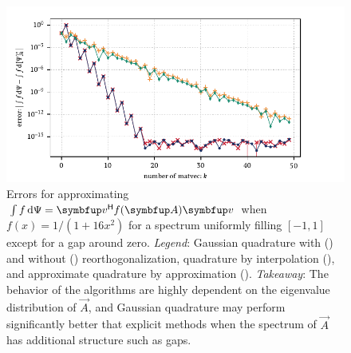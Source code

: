 \begin{figure}[htb]
    \begin{center}
        \includegraphics{imgs/ch3_runge_gap_spec.pdf} 
    \end{center}
    \caption[{Errors for approximating \( \int f \,\d\Psi =  \vec{v}^\cT f(\vec{A}) \vec{v} \) when \( f(x) = 1/(1+16x^2) \) for a spectrum uniformly filling       \( [-1,1] \) except for a gap around zero.}]{%
    Errors for approximating \( \int f \,\d\Psi =  \vec{v}^\cT f(\vec{A}) \vec{v} \) when \( f(x) = 1/(1+16x^2) \) for a spectrum uniformly filling       \( [-1,1] \) except for a gap around zero.
    \hspace{.25em}\emph{Legend}:
    Gaussian quadrature with 
    ({\protect{}})
    and without 
    ({\protect{}})
    reorthogonalization,
    quadrature by interpolation
    ({\protect{}}),
    and approximate quadrature by approximation
    ({\protect{}}).
    \hspace{.25em}\emph{Takeaway}:  
    The behavior of the algorithms are highly dependent on the eigenvalue distribution of \( \vec{A} \), and Gaussian quadrature may perform significantly better that explicit methods when the spectrum of \( \vec{A} \) has additional structure such as gaps. 
    }
    \label{fig:ch3_runge_gap_spec}
\end{figure}



